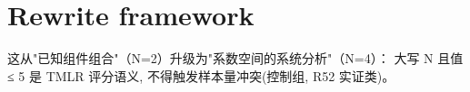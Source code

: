 \section{Rewrite framework}
这从"已知组件组合"（N=2）升级为"系数空间的系统分析"（N=4）：
大写 N 且值 ≤ 5 是 TMLR 评分语义, 不得触发样本量冲突(控制组, R52 实证类)。
